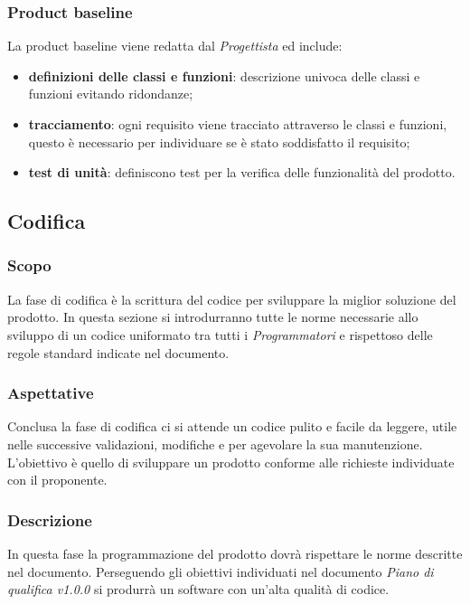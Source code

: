 \subsubsection{Product baseline}\label{2.2.4.5}
La product baseline viene redatta dal \textit{Progettista} ed include:
\begin{itemize}
	\item \textbf{definizioni delle classi e funzioni}: descrizione univoca delle classi e funzioni evitando ridondanze;
	\item \textbf{tracciamento}: ogni requisito viene tracciato attraverso le classi e funzioni, questo è necessario per individuare se è stato soddisfatto il requisito;
	\item \textbf{test di unità}: definiscono test per la verifica delle funzionalità del prodotto.
\end{itemize}
\subsection{Codifica}\label{2.2.5}

\subsubsection{Scopo}\label{2.2.5.1}
La fase di codifica è la scrittura del codice per sviluppare la miglior soluzione del prodotto. In questa sezione si introdurranno tutte le norme necessarie allo sviluppo di un codice uniformato tra tutti i \textit{Programmatori} e rispettoso delle regole standard indicate nel documento.
\subsubsection{Aspettative}\label{2.2.5.2}
Conclusa la fase di codifica ci si attende un codice pulito e facile da leggere, utile nelle successive validazioni, modifiche e per agevolare la sua manutenzione. L'obiettivo è quello di sviluppare un prodotto conforme alle richieste individuate con il proponente. 

\subsubsection{Descrizione}\label{2.2.5.3}
In questa fase la programmazione del prodotto dovrà rispettare le norme descritte nel documento. Perseguendo gli obiettivi individuati nel documento \textit{Piano di qualifica v1.0.0} si produrrà un software con un'alta qualità di codice.


